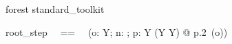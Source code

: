 \begin{zsection}
  \SECTION forest \parents standard\_toolkit
\end{zsection}

\begin{zed} [Y] \end{zed}

\begin{zed}
root\_step ~~==~~ (\lambda o: Y; n: \nat; p: Y \cross (Y \pfun Y) @ p.2~(o))
\end{zed}